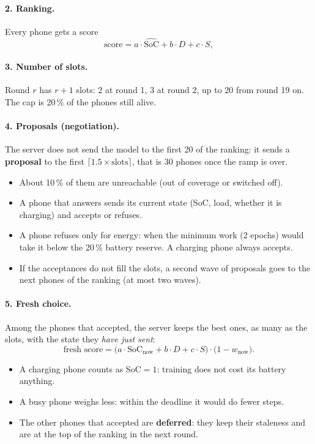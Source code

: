 \documentclass[11pt,a4paper]{article}
\begin{document}
\paragraph{2. Ranking.}
Every phone gets a score
\begin{equation*}
  \text{score} = a \cdot \widehat{\mathrm{SoC}} + b \cdot D + c \cdot S ,
\end{equation*}

\paragraph{3. Number of slots.}
Round $r$ has $r + 1$ slots: 2 at round 1, 3 at round 2, up to 20 from
round 19 on. The cap is 20\,\% of the phones still alive.

\paragraph{4. Proposals (negotiation).}
The server does not send the model to the first 20 of the ranking: it sends a
\textbf{proposal} to the first $\lceil 1.5 \times \text{slots} \rceil$, that
is 30 phones once the ramp is over.
\begin{itemize}
  \item About 10\,\% of them are unreachable (out of coverage or switched off).
  \item A phone that answers sends its current state (SoC, load, whether it is
        charging) and accepts or refuses.
  \item A phone refuses only for energy: when the minimum work (2 epochs) would
        take it below the 20\,\% battery reserve. A charging phone always
        accepts.
  \item If the acceptances do not fill the slots, a second wave of proposals
        goes to the next phones of the ranking (at most two waves).
\end{itemize}

\paragraph{5. Fresh choice.}
Among the phones that accepted, the server keeps the best ones, as many as
the slots, with the state they \emph{have just sent}:
\begin{equation*}
  \text{fresh score} = \bigl(a \cdot \mathrm{SoC}_{\text{now}} + b \cdot D
                        + c \cdot S\bigr) \cdot \bigl(1 - w_{\text{now}}\bigr).
\end{equation*}
\begin{itemize}
  \item A charging phone counts as $\mathrm{SoC} = 1$: training does not cost
        its battery anything.
  \item A busy phone weighs less: within the deadline it would do fewer steps.
  \item The other phones that accepted are \textbf{deferred}: they keep their
        staleness and are at the top of the ranking in the next round.
\end{itemize}
\end{document}
